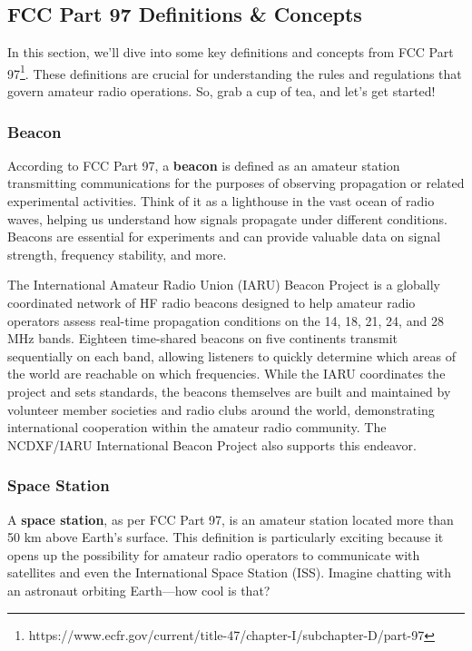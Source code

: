 \subsection{FCC Part 97 Definitions \& Concepts}
\label{subsec:fcc-definitions}

In this section, we'll dive into some key definitions and concepts from FCC Part 97\footnote{https://www.ecfr.gov/current/title-47/chapter-I/subchapter-D/part-97}. These definitions are crucial for understanding the rules and regulations that govern amateur radio operations. So, grab a cup of tea, and let's get started!

\subsubsection*{Beacon}
According to FCC Part 97, a \textbf{beacon} is defined as an amateur station transmitting communications for the purposes of observing propagation or related experimental activities. Think of it as a lighthouse in the vast ocean of radio waves, helping us understand how signals propagate under different conditions. Beacons are essential for experiments and can provide valuable data on signal strength, frequency stability, and more.

The International Amateur Radio Union (IARU) Beacon Project is a globally coordinated network of HF radio beacons designed to help amateur radio operators assess real-time propagation conditions on the 14, 18, 21, 24, and 28 MHz bands.  Eighteen time-shared beacons on five continents transmit sequentially on each band, allowing listeners to quickly determine which areas of the world are reachable on which frequencies. While the IARU coordinates the project and sets standards, the beacons themselves are built and maintained by volunteer member societies and radio clubs around the world, demonstrating international cooperation within the amateur radio community. The NCDXF/IARU International Beacon Project also supports this endeavor.

\subsubsection*{Space Station}
A \textbf{space station}, as per FCC Part 97, is an amateur station located more than 50 km above Earth's surface. This definition is particularly exciting because it opens up the possibility for amateur radio operators to communicate with satellites and even the International Space Station (ISS). Imagine chatting with an astronaut orbiting Earth—how cool is that?

